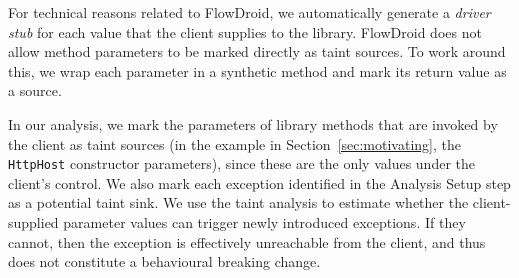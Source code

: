 For technical reasons related to FlowDroid, we automatically generate a \textit{driver stub} for each value that the client supplies to the library. FlowDroid does not allow method parameters to be marked directly as taint sources. To work around this, we wrap each parameter in a synthetic method and mark its return value as a source.

In our analysis, we mark the parameters of library methods that are invoked by the client as taint sources (in the example in Section~\ref{sec:motivating}, the \texttt{HttpHost} constructor parameters), since these are the only values under the client’s control. We also mark each exception identified in the Analysis Setup step as a potential taint sink. We use the taint analysis to estimate whether the client-supplied parameter values can trigger newly introduced exceptions. If they cannot, then the exception is effectively unreachable from the client, and thus does not constitute a behavioural breaking change. 




